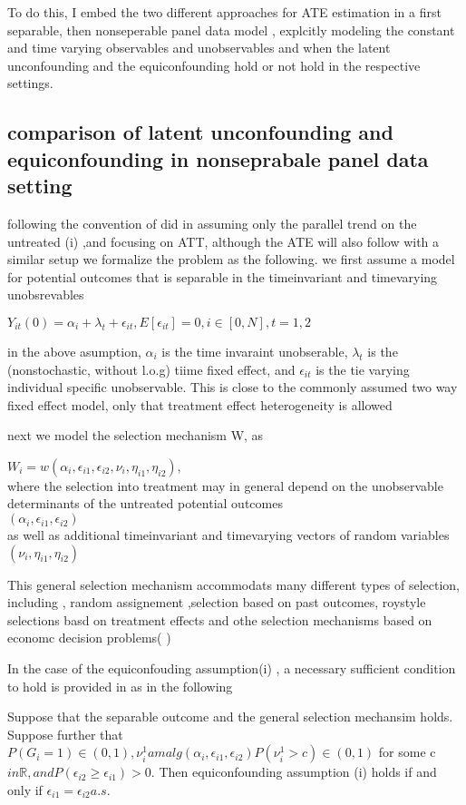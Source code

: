 \documentclass{article}
\begin{document}
 To do this, I embed the two different approaches for ATE estimation in a first separable, then nonseperable panel data model ,  explcitly modeling the constant and time varying observables and unobservables and when the latent unconfounding and the equiconfounding hold or not hold in the respective settings.  
 \subsection{comparison of latent unconfounding and equiconfounding in nonseprabale panel data setting}
 following the convention of did in assuming only the parallel trend on the untreated (i) ,and focusing on ATT, although the ATE will also follow with a similar setup
 we formalize the problem as the following.
     we first assume a model for potential outcomes that is separable in the timeinvariant and timevarying unobsrevables
    \begin{assumption}
     $Y_{it} ( 0) = \alpha_i + \lambda_t + \epsilon_{it}  , E[ \epsilon_{it} ] = 0 , i \in [0, N] , t =1,2$
     \end{assumption}
 in the above asumption, $\alpha_i$ is the time invaraint unobserable, $\lambda_t$ is the (nonstochastic, without l.o.g) tiime fixed effect, and $\epsilon_{it} $ is the tie varying individual specific unobservable. This is close to the commonly assumed two way fixed effect model, only that treatment effect heterogeneity is allowed
 
 next we model the selection mechanism W, as 

$ W_i = w( \alpha_i, \epsilon_{i1}, \epsilon_{i2}, \nu_i, \eta_{i1}, \eta_{i2} )  $, \\
where the selection into treatment may in general   depend on the unobservable determinants of the untreated potential outcomes  \\
 $(\alpha_i, \epsilon_{i1}, \epsilon_{i2} )$\\
as well as additional timeinvariant and timevarying vectors of random variables $ (\nu_i, \eta_{i1}, \eta_{i2} )$

 This general selection mechanism accommodats many different types of selection, including , random assignement ,selection based on past outcomes, roystyle selections basd on treatment effects and othe selection mechanisms based on economc decision problems( \cite{heckman and robb} )
 
 In the case of the equiconfouding assumption(i) , a necessary sufficient condition to hold is provided in \cite{ghanem et al} as in the following
 \begin{theorem}
 Suppose that the separable outcome and the general selection mechansim holds. Suppose further that $P(G_i = 1) \in (0,1) , \nu_i^1 amalg ( \alpha_i , \epsilon_{i1}, \epsilon_{i2} ) P( \nu_i^1 > c) \in (0,1) $ for some c $ in \mathbb{R}, and P (\epsilon_{i2} \geq \epsilon_{i1} ) > 0.$ Then equiconfounding assumption (i) holds if and only if $\epsilon_{i1} = \epsilon_{i2} a.s.$
 \end{theorem}
 
\end{document}

